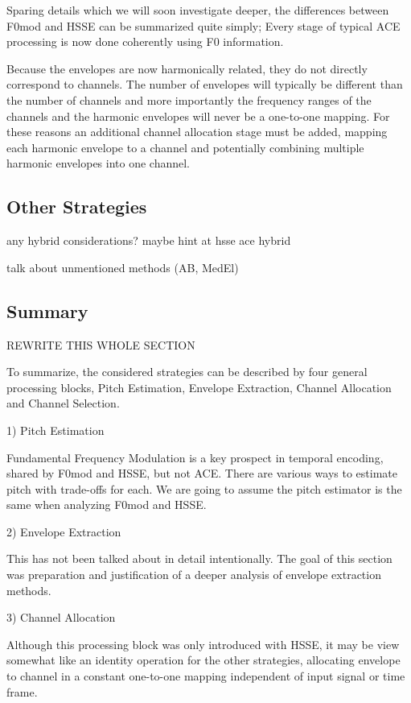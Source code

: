 \documentclass [11pt, proquest] {uwthesis}[2015/03/03]
\begin{document}
Sparing details which we will soon investigate deeper, the differences between F0mod and HSSE can be summarized quite simply;  Every stage of typical ACE processing is now done coherently using F0 information.

Because the envelopes are now harmonically related, they do not directly correspond to channels.  The number of envelopes will typically be different than the number of channels and more importantly the frequency ranges of the channels and the harmonic envelopes will never be a one-to-one mapping.  For these reasons an additional channel allocation stage must be added, mapping each harmonic envelope to a channel and potentially combining multiple harmonic envelopes into one channel.

\subsection{Other Strategies}

any hybrid considerations?  maybe hint at hsse ace hybrid

talk about unmentioned methods (AB, MedEl)

\subsection{Summary}

REWRITE THIS WHOLE SECTION

To summarize, the considered strategies can be described by four general processing blocks, Pitch Estimation, Envelope Extraction, Channel Allocation and Channel Selection.

1) Pitch Estimation

Fundamental Frequency Modulation is a key prospect in temporal encoding, shared by F0mod and HSSE, but not ACE.  There are various ways to estimate pitch with trade-offs for each.  We are going to assume the pitch estimator is the same when analyzing F0mod and HSSE.

2) Envelope Extraction

This has not been talked about in detail intentionally.  The goal of this section was preparation and justification of a deeper analysis of envelope extraction methods.

3) Channel Allocation

Although this processing block was only introduced with HSSE, it may be view somewhat like an identity operation for the other strategies, allocating envelope to channel in a constant one-to-one mapping independent of input signal or time frame.
\end{document}
